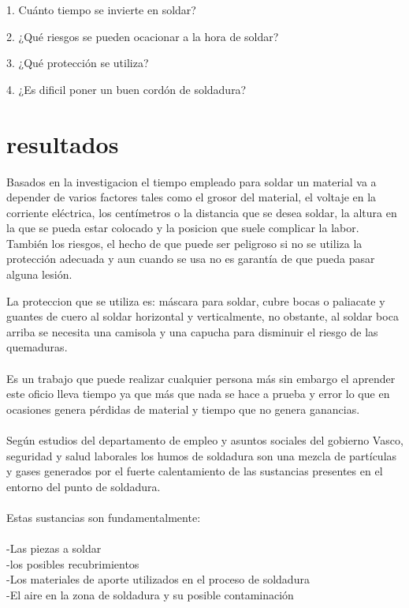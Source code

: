 \documentclass[12pt,letterpaper]{article}
\begin{document}
\begin{flushleft}
1. Cuánto tiempo se invierte en soldar?
\end{flushleft}
\begin{flushleft}
2.	¿Qué riesgos se pueden ocacionar a la hora de soldar?
\end{flushleft}
\begin{flushleft}
3.	¿Qué protección se utiliza?
\end{flushleft}
\begin{flushleft}
4.	¿Es dificil poner un buen cordón de soldadura?
\end{flushleft}

\newpage
\section*{resultados}

\begin{flushleft}
Basados en la investigacion el tiempo empleado para soldar un material va a depender de varios factores tales como el grosor del material, el voltaje en la corriente eléctrica, los centímetros o la distancia que se desea soldar, la altura en la que se pueda estar colocado y la posicion que suele complicar la labor. 
También los riesgos, el hecho de que puede ser peligroso si no se utiliza la protección adecuada y aun cuando se usa no es garantía de que pueda pasar alguna lesión.
\end{flushleft}
La proteccion que se utiliza es: máscara para soldar, cubre bocas o paliacate y guantes de cuero al soldar horizontal y verticalmente, no obstante, al soldar boca arriba se necesita una camisola y una capucha para disminuir el riesgo de las quemaduras.
\\\\
Es un trabajo que puede realizar cualquier persona más sin embargo el aprender este oficio lleva tiempo ya que más que nada se hace a prueba y error lo que en ocasiones genera pérdidas de material y tiempo que no genera ganancias.
\\\\
Según estudios del departamento de empleo y asuntos sociales del gobierno Vasco, seguridad y salud laborales los humos de soldadura son una mezcla de partículas y gases generados por el fuerte calentamiento de las sustancias presentes en el entorno del punto de soldadura.
\\\\
Estas sustancias son fundamentalmente:
\\\\
-Las piezas a soldar 
\\
-los posibles recubrimientos 
\\
-Los materiales de aporte utilizados en el proceso de soldadura 
\\
-El aire en la zona de soldadura y su posible contaminación
\end{document}
